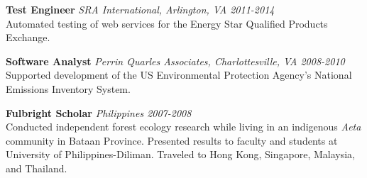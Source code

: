 \documentclass[line, margin]{res}
\begin{document}
\begin{resume}
\textbf{Test Engineer} \textit{SRA International, Arlington, VA \hfill 2011-2014} \\
Automated testing of web services for the Energy Star Qualified Products Exchange.

\textbf{Software Analyst} \textit{Perrin Quarles Associates, Charlottesville, VA \hfill 2008-2010} \\
Supported development of the US Environmental Protection Agency's National Emissions Inventory System.

\textbf{Fulbright Scholar} \textit{Philippines \hfill 2007-2008} \\
Conducted independent forest ecology research while living in an indigenous \textit{Aeta} community in Bataan Province.  Presented results to faculty and students at University of Philippines-Diliman.  Traveled to Hong Kong, Singapore, Malaysia, and Thailand.


\fancyfoot[C]{\thepage} %



\end{resume}
\end{document}
